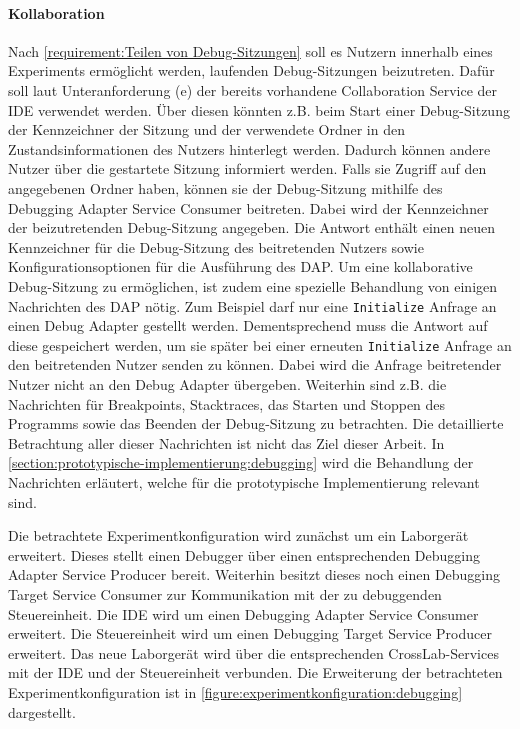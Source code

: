 \paragraph{Kollaboration} Nach \autoref{requirement:Teilen von Debug-Sitzungen} soll es Nutzern innerhalb eines Experiments ermöglicht werden, laufenden Debug-Sitzungen beizutreten. Dafür soll laut Unteranforderung (e) der bereits vorhandene Collaboration Service der IDE verwendet werden. Über diesen könnten z.B. beim Start einer Debug-Sitzung der Kennzeichner der Sitzung und der verwendete Ordner in den Zustandsinformationen des Nutzers hinterlegt werden. Dadurch können andere Nutzer über die gestartete Sitzung informiert werden. Falls sie Zugriff auf den angegebenen Ordner haben, können sie der Debug-Sitzung mithilfe des Debugging Adapter Service Consumer beitreten. Dabei wird der Kennzeichner der beizutretenden Debug-Sitzung angegeben. Die Antwort enthält einen neuen Kennzeichner für die Debug-Sitzung des beitretenden Nutzers sowie Konfigurationsoptionen für die Ausführung des \ac{DAP}. Um eine kollaborative Debug-Sitzung zu ermöglichen, ist zudem eine spezielle Behandlung von einigen Nachrichten des \ac{DAP} nötig. Zum Beispiel darf nur eine \texttt{Initialize} Anfrage an einen Debug Adapter gestellt werden. Dementsprechend muss die Antwort auf diese gespeichert werden, um sie später bei einer erneuten \texttt{Initialize} Anfrage an den beitretenden Nutzer senden zu können. Dabei wird die Anfrage beitretender Nutzer nicht an den Debug Adapter übergeben. Weiterhin sind z.B. die Nachrichten für Breakpoints, Stacktraces, das Starten und Stoppen des Programms sowie das Beenden der Debug-Sitzung zu betrachten. Die detaillierte Betrachtung aller dieser Nachrichten ist nicht das Ziel dieser Arbeit. In \autoref{section:prototypische-implementierung:debugging} wird die Behandlung der Nachrichten erläutert, welche für die prototypische Implementierung relevant sind.

Die betrachtete Experimentkonfiguration wird zunächst um ein Laborgerät erweitert. Dieses stellt einen Debugger über einen entsprechenden Debugging Adapter Service Producer bereit. Weiterhin besitzt dieses noch einen Debugging Target Service Consumer zur Kommunikation mit der zu debuggenden Steuereinheit. Die IDE wird um einen Debugging Adapter Service Consumer erweitert. Die Steuereinheit wird um einen Debugging Target Service Producer erweitert. Das neue Laborgerät wird über die entsprechenden CrossLab-Services mit der IDE und der Steuereinheit verbunden. Die Erweiterung der betrachteten Experimentkonfiguration ist in \autoref{figure:experimentkonfiguration:debugging} dargestellt.

